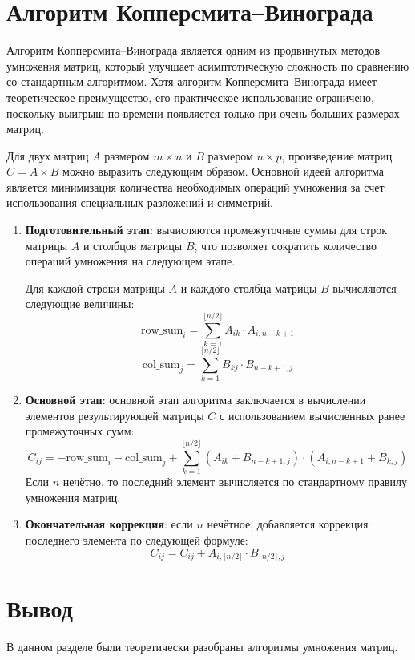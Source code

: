 \section{Алгоритм Копперсмита–Винограда}

Алгоритм Копперсмита–Винограда является одним из продвинутых методов умножения матриц,
который улучшает асимптотическую сложность по сравнению со стандартным алгоритмом.
Хотя алгоритм Копперсмита–Винограда имеет теоретическое преимущество,
его практическое использование ограничено, поскольку выигрыш по времени появляется только при очень больших размерах матриц.

Для двух матриц \( A \) размером \( m \times n \) и \( B \) размером \( n \times p \), произведение матриц \( C = A \times B \) можно выразить следующим образом. Основной идеей алгоритма является минимизация количества необходимых операций умножения за счет использования специальных разложений и симметрий.

\begin{enumerate}
    \item \textbf{Подготовительный этап}: вычисляются промежуточные суммы для строк матрицы \( A \) и столбцов матрицы \( B \), что позволяет сократить количество операций умножения на следующем этапе.
    
    Для каждой строки матрицы \( A \) и каждого столбца матрицы \( B \) вычисляются следующие величины:
    \[
    \text{row\_sum}_i = \sum_{k=1}^{\lfloor n/2 \rfloor} A_{ik} \cdot A_{i, n-k+1}
    \]
    \[
    \text{col\_sum}_j = \sum_{k=1}^{\lfloor n/2 \rfloor} B_{kj} \cdot B_{n-k+1, j}
    \]
    
    \item \textbf{Основной этап}: основной этап алгоритма заключается в вычислении элементов результирующей матрицы \( C \) с использованием вычисленных ранее промежуточных сумм:
    \[
    C_{ij} = - \text{row\_sum}_i - \text{col\_sum}_j + \sum_{k=1}^{\lfloor n/2 \rfloor} 
    (A_{ik} + B_{n-k+1,j}) \cdot (A_{i,n-k+1} + B_{k,j})
    \]
    Если \( n \) нечётно, то последний элемент вычисляется по стандартному правилу умножения матриц.

    \item \textbf{Окончательная коррекция}: если \( n \) нечётное, добавляется коррекция последнего элемента по следующей формуле:
    \[
    C_{ij} = C_{ij} + A_{i, \lceil n/2 \rceil} \cdot B_{\lceil n/2 \rceil, j}
    \]
\end{enumerate}

\section*{Вывод}
В данном разделе были теоретически разобраны алгоритмы умножения матриц.

